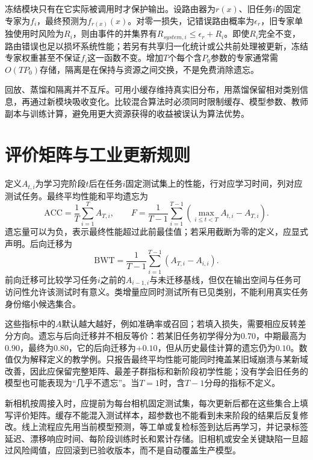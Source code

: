 冻结模块只有在它实际被调用时才保护输出。设路由器为$r(x)$、旧任务$i$的固定专家为$f_i$，最终预测为$f_{r(x)}(x)$。对零一损失，记错误路由概率为$\epsilon_r$，旧专家单独使用时风险为$R_i$，则由事件的并集界有$R_{system,i}\leq\epsilon_r+R_i$。即使$R_i$完全不变，路由错误也足以损坏系统性能；若另有共享归一化统计或公共前处理被更新，冻结专家权重甚至不保证$f_i$这一函数不变。增加$T$个每个含$P_0$参数的专家通常需$O(TP_0)$存储，隔离是在保持与资源之间交换，不是免费消除遗忘。

回放、蒸馏和隔离并不互斥。可用小缓存维持真实旧分布，用蒸馏保留相对类别信息，再通过新模块吸收变化。比较混合算法时必须同时限制缓存、模型参数、教师副本与训练计算，避免用更大资源获得的收益被误认为算法优势。

\section{评价矩阵与工业更新规则}
定义$A_{t,i}$为学习完阶段$t$后在任务$i$固定测试集上的性能，行对应学习时间，列对应测试任务。最终平均性能和平均遗忘为
\begin{equation}
 \mathrm{ACC}=\frac1T\sum_{i=1}^TA_{T,i},\qquad
 F=\frac1{T-1}\sum_{i=1}^{T-1}
 \left(\max_{i\leq t<T}A_{t,i}-A_{T,i}\right).
\end{equation}
遗忘量可以为负，表示最终性能超过此前最佳值；若采用截断为零的定义，应显式声明。后向迁移为
\begin{equation}
 \mathrm{BWT}=\frac1{T-1}\sum_{i=1}^{T-1}(A_{T,i}-A_{i,i}).
\end{equation}
前向迁移可比较学习任务$i$之前的$A_{i-1,i}$与未迁移基线，但仅在输出空间与任务可访问性允许该测试时有意义\cite{lopezpaz2017gem}。类增量应同时测试所有已见类别，不能利用真实任务身份缩小候选集合。

这些指标中的$A$默认越大越好，例如准确率或召回；若填入损失，需要相应反转差分方向。遗忘与后向迁移并不相反等价：若某旧任务初学得分为$0.70$，中期最高为$0.90$，最终为$0.80$，它的后向迁移为$+0.10$，但从历史最佳计算的遗忘仍为$0.10$。数值仅为解释定义的教学例。只报告最终平均性能可能同时掩盖某旧域崩溃与某新域改善，因此应保留完整矩阵、最差子群指标和新阶段初学性能；没有学会旧任务的模型也可能表现为“几乎不遗忘”。当$T=1$时，含$T-1$分母的指标不定义。

新相机按周接入时，应提前为每台相机固定测试集，每次更新后都在这些集合上填写评价矩阵。缓存不能混入测试样本，超参数也不能看到未来阶段的结果后反复修改。线上流程应先用当前模型预测，等工单或复检标签到达后再学习，并记录标签延迟、漂移响应时间、每阶段训练时长和累计存储。旧相机或安全关键缺陷一旦超过风险阈值，应回滚到已验收版本，而不是自动覆盖生产模型。

